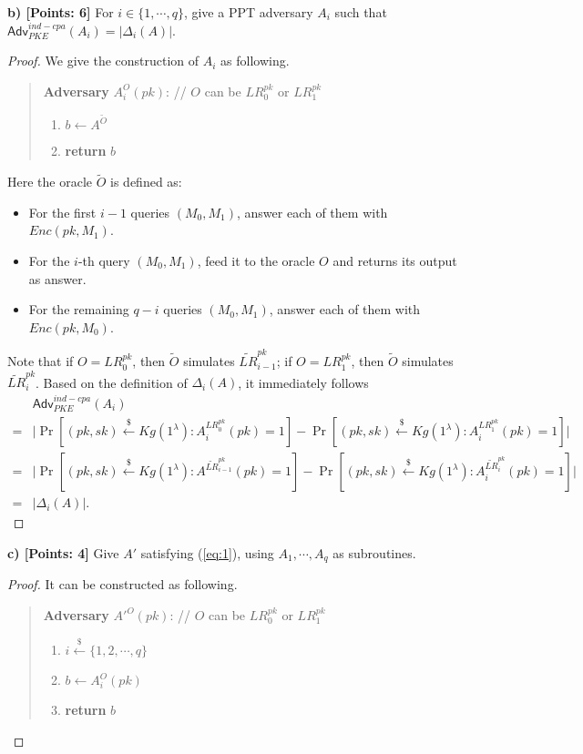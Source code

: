 \documentclass[12pt]{article}
\newcommand{\getsr}{\stackrel{\$}{\gets}}
\newcommand{\Adv}{\textsf{Adv}}
\theoremstyle{definition}
\begin{document}
{\bf b) [Points: 6]} For $i \in \{1, \cdots, q\}$, give a PPT adversary $A_i$ such that $\Adv_{PKE}^{ind-cpa}(A_i) = |\Delta_i(A)|$.
\begin{proof}
We give the construction of $A_i$ as following.
\begin{quote}
{\bf Adversary} $A_i^{O}(pk)$: // $O$ can be $LR_0^{pk}$ or $LR_1^{pk}$
\begin{enumerate}
\item $b \gets A^{\tilde{O}}$
\item {\bf return} $b$
\end{enumerate}
\end{quote}
Here the oracle $\tilde{O}$ is defined as:
\begin{itemize}
\item For the first $i-1$ queries $(M_0,M_1)$, answer each of them with $Enc(pk, M_1)$.
\item For the $i$-th query $(M_0,M_1)$, feed it to the oracle $O$ and returns its output as answer.
\item For the remaining $q-i$ queries $(M_0,M_1)$, answer each of them with $Enc(pk, M_0)$.
\end{itemize}
Note that if $O = LR_0^{pk}$, then $\tilde{O}$ simulates $\widetilde{LR}_{i-1}^{pk}$; if $O = LR_1^{pk}$, then $\tilde{O}$ simulates $\widetilde{LR}_{i}^{pk}$. Based on the definition of $\Delta_i(A)$, it immediately follows 
$$\begin{aligned}
& \Adv_{PKE}^{ind-cpa}(A_i) \\
=& \bigg| \Pr[(pk,sk) \getsr Kg(1^\lambda) : A_i^{LR_0^{pk}}(pk)=1] - \Pr[(pk,sk) \getsr Kg(1^\lambda) : A_i^{LR_1^{pk}}(pk)=1] \bigg| \\
=& \bigg| \Pr[(pk,sk) \getsr Kg(1^\lambda) : A^{\widetilde{LR}_{i-1}^{pk}}(pk)=1] - \Pr[(pk,sk) \getsr Kg(1^\lambda) : A_i^{\widetilde{LR}_{i}^{pk}}(pk)=1] \bigg| \\
=& |\Delta_i(A)|.
\end{aligned}$$
\end{proof}

{\bf c) [Points: 4]} Give $A'$ satisfying (\ref{eq:1}), using $A_1, \cdots, A_q$ as subroutines.
\begin{proof}
It can be constructed as following.
\begin{quote}
{\bf Adversary} $A'^O(pk)$: // $O$ can be $LR_0^{pk}$ or $LR_1^{pk}$
\begin{enumerate}
\item $i \getsr \{1, 2, \cdots, q\}$
\item $b \gets A_i^O(pk)$
\item {\bf return} $b$
\end{enumerate}
\end{quote}
\end{proof}
\end{document}
